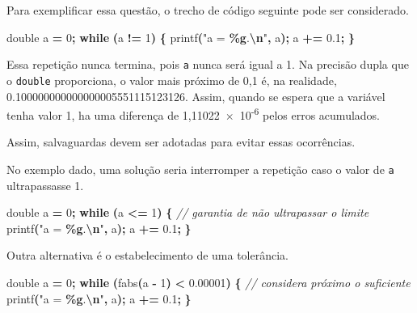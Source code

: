 \documentclass[
  11pt,
  a4paper,
]{scrbook}
\newenvironment{Shaded}{\begin{snugshade}}{\end{snugshade}}
\newcommand{\CommentTok}[1]{\textcolor[rgb]{0.56,0.35,0.01}{\textit{#1}}}
\newcommand{\ControlFlowTok}[1]{\textcolor[rgb]{0.13,0.29,0.53}{\textbf{#1}}}
\newcommand{\DataTypeTok}[1]{\textcolor[rgb]{0.13,0.29,0.53}{#1}}
\newcommand{\DecValTok}[1]{\textcolor[rgb]{0.00,0.00,0.81}{#1}}
\newcommand{\FloatTok}[1]{\textcolor[rgb]{0.00,0.00,0.81}{#1}}
\newcommand{\NormalTok}[1]{#1}
\newcommand{\OperatorTok}[1]{\textcolor[rgb]{0.81,0.36,0.00}{\textbf{#1}}}
\newcommand{\SpecialCharTok}[1]{\textcolor[rgb]{0.81,0.36,0.00}{\textbf{#1}}}
\newcommand{\StringTok}[1]{\textcolor[rgb]{0.31,0.60,0.02}{#1}}
\begin{document}
Para exemplificar essa questão, o trecho de código seguinte pode ser
considerado.

\begin{Shaded}
\begin{Highlighting}[]
\DataTypeTok{double}\NormalTok{ a }\OperatorTok{=} \DecValTok{0}\OperatorTok{;}
\ControlFlowTok{while} \OperatorTok{(}\NormalTok{a }\OperatorTok{!=} \DecValTok{1}\OperatorTok{)} \OperatorTok{\{}
\NormalTok{    printf}\OperatorTok{(}\StringTok{"a = }\SpecialCharTok{\%g}\StringTok{.}\SpecialCharTok{\textbackslash{}n}\StringTok{"}\OperatorTok{,}\NormalTok{ a}\OperatorTok{);}
\NormalTok{    a }\OperatorTok{+=} \FloatTok{0.1}\OperatorTok{;}
\OperatorTok{\}}
\end{Highlighting}
\end{Shaded}

Essa repetição nunca termina, pois \texttt{a} nunca será igual a 1. Na
precisão dupla que o \texttt{double} proporciona, o valor mais próximo
de 0,1 é, na realidade, 0.100000000000000005551115123126. Assim, quando
se espera que a variável tenha valor 1, ha uma diferença de
1,11022~\(\times\)~10\textsuperscript{-6} pelos erros acumulados.

Assim, salvaguardas devem ser adotadas para evitar essas ocorrências.

No exemplo dado, uma solução seria interromper a repetição caso o valor
de \texttt{a} ultrapassasse 1.

\begin{Shaded}
\begin{Highlighting}[]
\DataTypeTok{double}\NormalTok{ a }\OperatorTok{=} \DecValTok{0}\OperatorTok{;}
\ControlFlowTok{while} \OperatorTok{(}\NormalTok{a }\OperatorTok{\textless{}=} \DecValTok{1}\OperatorTok{)} \OperatorTok{\{}  \CommentTok{// garantia de não ultrapassar o limite}
\NormalTok{    printf}\OperatorTok{(}\StringTok{"a = }\SpecialCharTok{\%g}\StringTok{.}\SpecialCharTok{\textbackslash{}n}\StringTok{"}\OperatorTok{,}\NormalTok{ a}\OperatorTok{);}
\NormalTok{    a }\OperatorTok{+=} \FloatTok{0.1}\OperatorTok{;}
\OperatorTok{\}}
\end{Highlighting}
\end{Shaded}

Outra alternativa é o estabelecimento de uma tolerância.

\begin{Shaded}
\begin{Highlighting}[]
\DataTypeTok{double}\NormalTok{ a }\OperatorTok{=} \DecValTok{0}\OperatorTok{;}
\ControlFlowTok{while} \OperatorTok{(}\NormalTok{fabs}\OperatorTok{(}\NormalTok{a }\OperatorTok{{-}} \DecValTok{1}\OperatorTok{)} \OperatorTok{\textless{}} \FloatTok{0.00001}\OperatorTok{)} \OperatorTok{\{}  \CommentTok{// considera próximo o suficiente}
\NormalTok{    printf}\OperatorTok{(}\StringTok{"a = }\SpecialCharTok{\%g}\StringTok{.}\SpecialCharTok{\textbackslash{}n}\StringTok{"}\OperatorTok{,}\NormalTok{ a}\OperatorTok{);}
\NormalTok{    a }\OperatorTok{+=} \FloatTok{0.1}\OperatorTok{;}
\OperatorTok{\}}
\end{Highlighting}
\end{Shaded}
\end{document}
